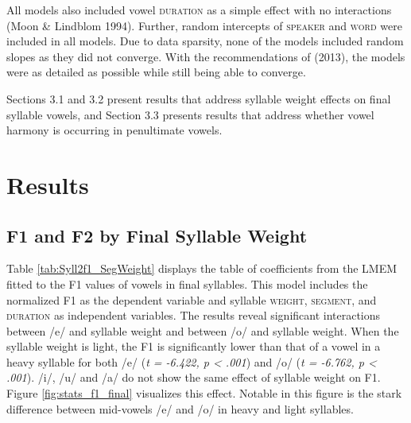 \documentclass[12pt]{ouparticle}
\begin{document}
All models also included vowel \textsc{duration} as a simple effect with no interactions (Moon \& Lindblom 1994). Further, random intercepts of \textsc{speaker} and \textsc{word} were included in all models. Due to data sparsity, none of the models included random slopes as they did not converge. With the recommendations of \citeauthor{barr2013} (2013), the models were as detailed as possible while still being able to converge.

Sections 3.1 and 3.2 present results that address syllable weight effects on final syllable vowels, and Section 3.3 presents results that address whether vowel harmony is occurring in penultimate vowels.


\section{Results}\label{sec:results}

\subsection{F1 and F2 by Final Syllable Weight}\label{sec:Syll1f1_SegWeight}

Table \ref{tab:Syll2f1_SegWeight} displays the table of coefficients from the LMEM fitted to the F1 values of vowels in final syllables. This model includes the normalized F1 as the dependent variable and syllable \textsc{weight}, \textsc{segment}, and \textsc{duration} as independent variables. The results reveal significant interactions between /e/ and syllable weight and between /o/ and syllable weight. When the syllable weight is light, the F1 is significantly lower than that of a vowel in a heavy syllable for both /e/ (\textit{t = -6.422, p < .001}) and /o/ (\textit{t = -6.762, p < .001}). /i/, /u/ and /a/ do not show the same effect of syllable weight on F1. Figure \ref{fig:stats_f1_final} visualizes this effect. Notable in this figure is the stark difference between mid-vowels /e/ and /o/ in heavy and light syllables.
\end{document}

